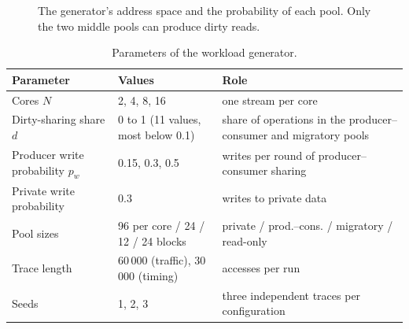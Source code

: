 \begin{figure}[htbp]
\centering
\begin{bigfig}[0.9]
\end{bigfig}
\caption[Address pools of the generator]{The generator's address space and the
probability of each pool. Only the two middle pools can produce dirty reads.}
\label{fig:addr-pools}
\end{figure}

\begin{table}[htbp]
\centering
\caption{Parameters of the workload generator.}
\label{tab:wl-params}
\small
\begin{tabular}{@{}L{3.6cm} L{3.6cm} L{5.4cm}@{}}
\toprule
Parameter & Values & Role \\
\midrule
Cores $N$ & 2, 4, 8, 16 & one stream per core \\
Dirty-sharing share $d$ & 0 to 1 (11 values, most below 0.1) & share of operations in the producer--consumer and migratory pools \\
Producer write probability $p_w$ & 0.15, 0.3, 0.5 & writes per round of producer--consumer sharing \\
Private write probability & 0.3 & writes to private data \\
Pool sizes & 96 per core / 24 / 12 / 24 blocks & private / prod.--cons. / migratory / read-only \\
Trace length & 60\,000 (traffic), 30\,000 (timing) & accesses per run \\
Seeds & 1, 2, 3 & three independent traces per configuration \\
\bottomrule
\end{tabular}
\end{table}

